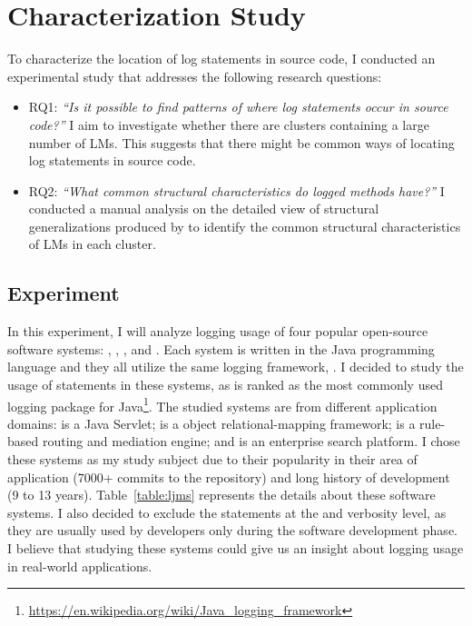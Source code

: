 \chapter{Characterization Study}\label{discover}\label{eval}

To characterize the location of log statements in source code, I conducted an experimental study that addresses the following research questions:

\begin{itemize} [leftmargin=.5in]
\item \textsc{RQ1: }\emph{``Is it possible to find patterns of where log statements occur in source code?''} I aim to investigate whether there are clusters containing a large number of LMs. This suggests that there might be common ways of locating log statements in source code.

\item \textsc{RQ2: }\emph{``What common structural characteristics do logged methods have?''} I conducted a manual analysis on the detailed view of structural generalizations produced by  to identify the common structural characteristics of LMs in each cluster.
\end{itemize}


\section{Experiment}  \label{setup-characterization}
In this experiment, I will analyze logging usage of four popular open-source software systems: , , , and . Each system is written in the Java programming language and they all utilize the same logging framework, . I decided to study the usage of  statements in these systems, as  is ranked as the most commonly used logging package for Java\footnote{\url{https://en.wikipedia.org/wiki/Java_logging_framework}}. The studied systems are from different application domains:  is a Java Servlet;  is a object relational-mapping framework;  is a rule-based routing and mediation engine; and  is an enterprise search platform. I chose these systems as my study subject due to their popularity in their area of application (7000+ commits to the  repository) and long history of development (9 to 13 years). Table~\ref{table:ljms} represents the details about these software systems. I also decided to exclude the  statements at the  and  verbosity level, as they are usually used by developers only during the software development phase. I believe that studying these systems could give us an insight about logging usage in real-world applications.


